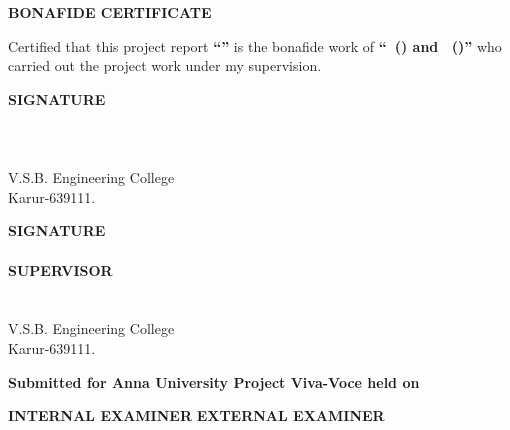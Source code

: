 \thispagestyle{empty}
\begin{center}
  {\fontsize{18pt}{22pt}\selectfont\bfseries \UniversityCertHeader\par}
  \vspace{1.2cm}
  {\fontsize{16pt}{20pt}\selectfont\bfseries BONAFIDE CERTIFICATE\par}
\end{center}
\vspace{1.0cm}

{\fontsize{12.5pt}{21pt}\selectfont\noindent
Certified that this project report \textbf{``\ProjectTitleSingleLine''} is the bonafide work of \textbf{``\StudentOneNameFormal\ (\StudentOneRegNo) and \StudentTwoNameFormal\ (\StudentTwoRegNo)''} who carried out the project work under my supervision.\par}

\vspace{3.0cm}

\noindent
\begin{minipage}[t]{0.50\textwidth}
  {\fontsize{14pt}{18pt}\selectfont\bfseries SIGNATURE}\\[1.4cm]
  {\fontsize{13pt}{17pt}\selectfont \HODName}\\[3pt]
  {\fontsize{14pt}{18pt}\selectfont\bfseries \HODDesignation}\\[12pt]
  {\fontsize{14pt}{18pt}\selectfont \HODDepartment\\
  V.S.B. Engineering College\\
  Karur-639111.}
\end{minipage}%
\hfill
\begin{minipage}[t]{0.48\textwidth}
  {\fontsize{14pt}{18pt}\selectfont\bfseries SIGNATURE}\\[1.4cm]
  {\fontsize{13pt}{17pt}\selectfont \SupervisorName}\\[3pt]
  {\fontsize{14pt}{18pt}\selectfont\bfseries SUPERVISOR}\\[3pt]
  {\fontsize{14pt}{18pt}\selectfont \SupervisorDesignation}\\[6pt]
  {\fontsize{14pt}{18pt}\selectfont \SupervisorDepartment\\
  V.S.B. Engineering College\\
  Karur-639111.}
\end{minipage}

\vspace{2.2cm}
\noindent
{\fontsize{13pt}{17pt}\selectfont\bfseries Submitted for Anna University Project Viva-Voce held on \underline{\hspace{3.5cm}}}

\vspace{1.8cm}
\noindent
{\fontsize{14pt}{18pt}\selectfont\bfseries INTERNAL EXAMINER} \hfill {\fontsize{14pt}{18pt}\selectfont\bfseries EXTERNAL EXAMINER}
\newpage
